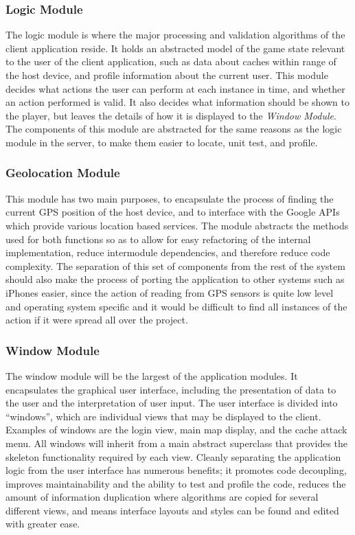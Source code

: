 \subsubsection{Logic Module}
The logic module is where the major processing and validation algorithms of the client application reside. It holds an abstracted model of the game state relevant to the user of the client application, such as data about caches within range of the host device, and profile information about the current user. This module decides what actions the user can perform at each instance in time, and whether an action performed is valid. It also decides what information should be shown to the player, but leaves the details of how it is displayed to the \emph{Window Module}. The components of this module are abstracted for the same reasons as the logic module in the server, to make them easier to locate, unit test, and profile.

\subsubsection{Geolocation Module}
This module has two main purposes, to encapsulate the process of finding the current GPS position of the host device, and to interface with the Google APIs which provide various location based services. The module abstracts the methods used for both functions so as to allow for easy refactoring of the internal implementation, reduce intermodule dependencies, and therefore reduce code complexity. The separation of this set of components from the rest of the system should also make the process of porting the application to other systems such as iPhones easier, since the action of reading from GPS sensors is quite low level and operating system specific and it would be difficult to find all instances of the action if it were spread all over the project.

\subsubsection{Window Module}
The window module will be the largest of the application modules. It encapsulates the graphical user interface, including the presentation of data to the user and the interpretation of user input. The user interface is divided into ``windows'', which are individual views that may be displayed to the client. Examples of windows are the login view, main map display, and the cache attack menu. All windows will inherit from a main abstract superclass that provides the skeleton functionality required by each view. Cleanly separating the application logic from the user interface has numerous benefits; it promotes code decoupling, improves maintainability and the ability to test and profile the code, reduces the amount of information duplication where algorithms are copied for several different views, and means interface layouts and styles can be found and edited with greater ease.
